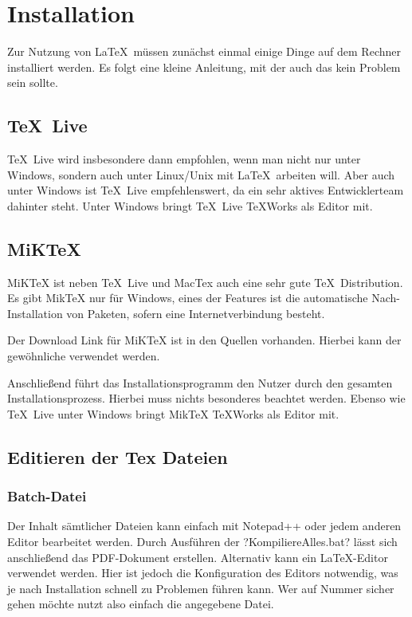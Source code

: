 
\chapter{Installation}\label{ch:installation}

Zur Nutzung von \LaTeX\ müssen zunächst einmal einige Dinge auf dem Rechner installiert werden. 
Es folgt eine kleine Anleitung, mit der auch das kein Problem sein sollte.

\section{\TeX\ Live}

\TeX\ Live wird insbesondere dann empfohlen, wenn man nicht nur unter Windows, sondern auch unter Linux/Unix mit \LaTeX\ arbeiten will. Aber auch unter Windows ist \TeX\ Live empfehlenswert, da ein sehr aktives Entwicklerteam dahinter steht. Unter Windows bringt \TeX\ Live \TeX Works als Editor mit.

\section{MiKTeX}

MiKTeX ist neben \TeX\ Live und MacTex auch eine sehr gute \TeX\ Distribution. Es gibt MikTeX nur für Windows, eines der Features ist die automatische Nach-Installation von Paketen, sofern eine Internetverbindung besteht.

Der Download Link für MiKTeX ist in den Quellen vorhanden. Hierbei kann der gewöhnliche  verwendet werden. 

Anschließend führt das Installationsprogramm den Nutzer durch den gesamten Installationsprozess. Hierbei muss nichts besonderes beachtet werden. Ebenso wie \TeX\ Live unter Windows bringt MikTeX \TeX Works als Editor mit.

\section{Editieren der Tex Dateien}
\subsection{Batch-Datei}
Der Inhalt sämtlicher Dateien kann einfach mit Notepad++ oder jedem anderen Editor bearbeitet werden. Durch Ausführen der \befehl?KompiliereAlles.bat? lässt sich anschließend das PDF-Dokument erstellen. Alternativ kann ein \LaTeX-Editor verwendet werden. Hier ist jedoch die Konfiguration des Editors notwendig, was je nach Installation schnell zu Problemen führen kann. Wer auf Nummer sicher gehen möchte nutzt also einfach die angegebene Datei.

